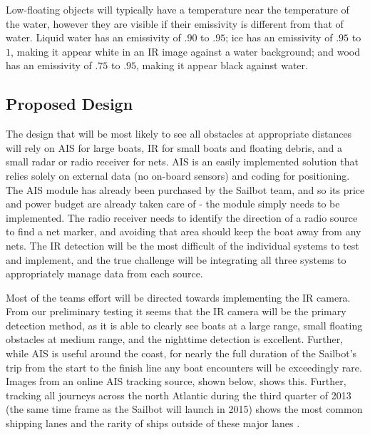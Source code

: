 Low-floating objects will typically have a temperature near the temperature of the water, however they are visible if their emissivity is different from that of water. Liquid water has an emissivity of $.90$ to $.95$; ice has an emissivity of $.95$ to $1$, making it appear white in an IR image against a water background; and wood has an emissivity of $.75$ to $.95$, making it appear black against water. \cite{optotherm-emisstable}


\subsection{\label{sec:method:proposed-design}Proposed Design}
The design that will be most likely to see all obstacles at appropriate distances will rely on AIS for large boats, IR for small boats and floating debris, and a small radar or radio receiver for nets. AIS is an easily implemented solution that relies solely on external data (no on-board sensors) and coding for positioning. The AIS module has already been purchased by the Sailbot team, and so its price and power budget are already taken care of - the module simply needs to be implemented. The radio receiver needs to identify the direction of a radio source to find a net marker, and avoiding that area should keep the boat away from any nets. The IR detection will be the most difficult of the individual systems to test and implement, and the true challenge will be integrating all three systems to appropriately manage data from each source.

Most of the teams effort will be directed towards implementing the IR camera. From our preliminary testing it seems that the IR camera will be the primary detection method, as it is able to clearly see boats at a large range, small floating obstacles at medium range, and the nighttime detection is excellent. Further, while AIS is useful around the coast, for nearly the full duration of the Sailbot's trip from the start to the finish line any boat encounters will be exceedingly rare. Images from an online AIS tracking source, shown below, shows this. Further, tracking all journeys across the north Atlantic during the third quarter of 2013 (the same time frame as the Sailbot will launch in 2015) shows the most common shipping lanes and the rarity of ships outside of these major lanes \cite{marine-traffic}.

